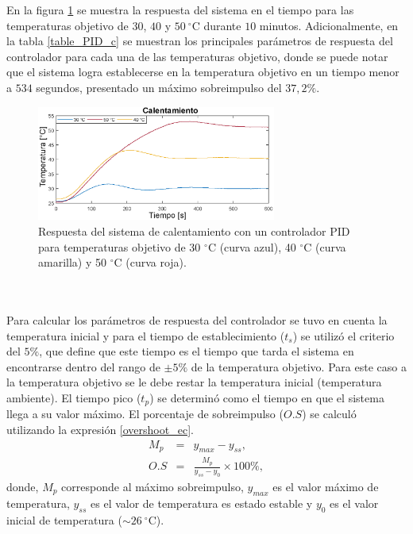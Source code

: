 En la figura \ref{fig:Respuesta_PID_c} se muestra la respuesta del sistema en el tiempo para las temperaturas objetivo de $30$, $40$ \mbox{y} $50~^\circ \mbox{C}$ durante $10$ minutos. Adicionalmente, en la tabla \ref{table_PID_c} se muestran los principales parámetros de respuesta del controlador para cada una de las temperaturas objetivo, donde se puede notar que el sistema logra establecerse en la temperatura objetivo en un tiempo menor a $534$ segundos, presentado un máximo sobreimpulso del $37,2\%$.
\begin{figure}[h!]
\begin{centering}
  \includegraphics[width=0.7\textwidth]{Images/PID_calentamiento.eps}
    \caption{Respuesta del sistema de calentamiento con un controlador PID para temperaturas objetivo de 30 $^\circ $C (curva azul), 40 $^\circ $C (curva amarilla) y 50 $^\circ $C (curva roja).}
    \label{fig:Respuesta_PID_c}
  \par\end{centering}
\end{figure}
\\ \\
Para calcular los parámetros de respuesta del controlador se tuvo en cuenta la temperatura inicial y para el tiempo de establecimiento ($t_s$) se utilizó el criterio del $5\%$, que define que este tiempo es el tiempo que tarda el sistema en encontrarse dentro del rango de  $\pm5\%$ de la temperatura objetivo. Para este caso a la temperatura objetivo se le debe restar la temperatura inicial (temperatura ambiente). El tiempo pico ($t_p$) se determinó como el tiempo en que el sistema llega a su valor máximo. El porcentaje de sobreimpulso ($O.S$) se calculó utilizando la expresión \ref{overshoot_ec}.\\ 
\begin{eqnarray}
    M_p&=& y_{max} - y_{ss},\\
    O.S&=&\frac{M_p}{y_{ss}-y_0}\times100\%,
    \label{overshoot_ec}
\end{eqnarray}
donde, $M_p$ corresponde al máximo sobreimpulso, $y_{max}$ es el valor máximo de temperatura, $y_{ss}$ es el valor de temperatura es estado estable y $y_0$ es el valor inicial de temperatura ($\sim26~^\circ \mbox{C}$).
